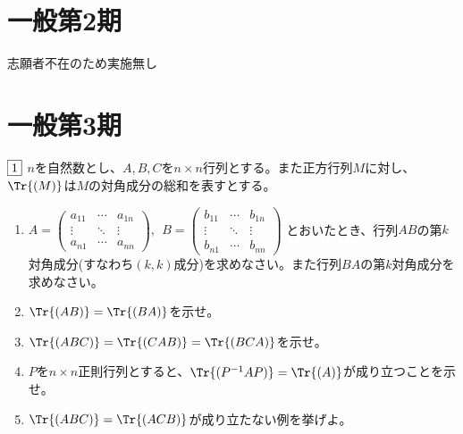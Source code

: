\documentclass[dvipdfmx]{jsreport}
\begin{document}
\begin{souanswer}
\begin{enumerate}
\end{enumerate}
\end{souanswer}

\section{一般第2期}
	志願者不在のため実施無し

\section{一般第3期}
\begin{tcolorbox} %
	$\fbox{1}$ $n$を自然数とし、$A, B, C$を$n\times n$行列とする。また正方行列$M$に対し、$\Tr{(M)}$は$M$の対角成分の総和を表すとする。
\begin{enumerate}
	\item $
	A= 
\begin{pmatrix}
	a_{11}& \cdots& a_{1n}\\
	\vdots& \ddots& \vdots\\
	a_{n1}& \cdots& a_{nn}
\end{pmatrix},\ \ 
	B= 
\begin{pmatrix}
	b_{11}& \cdots& b_{1n}\\
	\vdots& \ddots& \vdots\\
	b_{n1}& \cdots& b_{nn}
\end{pmatrix}$
	とおいたとき、行列$AB$の第$k$対角成分(すなわち$(k, k)$成分)を求めなさい。また行列$BA$の第$k$対角成分を求めなさい。
	\item $\Tr{(AB)}= \Tr{(BA)}$を示せ。
	\item $\Tr{(ABC)}= \Tr{(CAB)}= \Tr{(BCA)}$を示せ。
	\item $P$を$n\times n$正則行列とすると、$\Tr{(P^{-1}AP)}= \Tr{(A)}$が成り立つことを示せ。
	\item $\Tr{(ABC)}= \Tr{(ACB)}$が成り立たない例を挙げよ。
\end{enumerate}
\end{tcolorbox}
\end{document}
